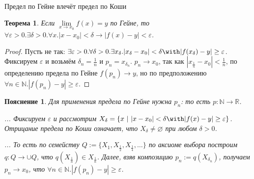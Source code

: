 \documentclass[aspectratio=169]{beamer}
\newtheorem{thm}{Теорема}[section]
\newtheorem{snote}{Пояснение}[section]
\begin{document}
\begin{frame}{Предел по Гейне влечёт предел по Коши}
\begin{thm}
Если $\lim\limits_{x \rightarrow x_0}f(x) = y$ по Гейне, то
$\forall \varepsilon>0.\exists \delta>0.\forall x.|x-x_0|<\delta \rightarrow |f(x)-y| < \varepsilon$.
\end{thm}

\begin{proof}
Пусть не так:
$\exists \varepsilon>0.\forall \delta>0.\exists x_\delta.|x_\delta-x_0|<\delta \with |f(x_\delta)-y| \ge \varepsilon$.
Фиксируем $\varepsilon$ и возьмём $\delta_n = \frac{1}{n}$ и $p_n = x_{\delta_n}$. 
$p_n \rightarrow x_0$, так как $|x_\frac{1}{n} - x_0| < \frac{1}{n}$, 
по определению предела по Гейне $f(p_n) \rightarrow y$, 
но по предположению $\forall n\in\mathbb{N}.|f(p_n) - y| \ge \varepsilon$.
\end{proof}\pause

\begin{snote}
Для применения предела по Гейне нужна $p_n$: то есть $p: \mathbb{N}\rightarrow\mathbb{R}$.
\pause

... %
Фиксируем $\varepsilon$ и рассмотрим $X_\delta = \{ x \ |\ |x-x_0| <\delta \with |f(x)-y| \ge \varepsilon\}$.
Отрицание предела по Коши означает, что $X_\delta \ne \varnothing$ при любом $\delta > 0$.
\pause

... То есть по семейству $Q:=\{ X_1, X_\frac{1}{2}, X_\frac{1}{4}, \dots \}$ 
по аксиоме выбора построим $q: Q \rightarrow \cup Q$, что $q(X_\frac{1}{n}) \in X_\frac{1}{n}$.
Далее, взяв композицию $p_n := q(X_{\delta_n})$, получаем $p_n \rightarrow x_0$, что $\forall n\in\mathbb{N}.|f(p_n) - y| \ge \varepsilon$.
\end{snote}
\end{frame}
\end{document}
